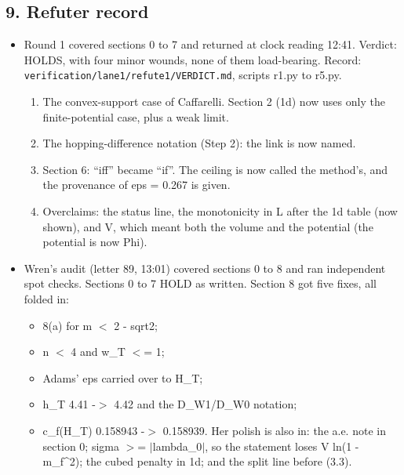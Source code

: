 \documentclass[11pt,a4paper]{article}
\begin{document}
\subsection*{9. Refuter record}
\begin{itemize}
\item{} Round 1 covered sections 0 to 7 and returned at clock reading 12:41. Verdict: HOLDS, with four minor wounds, none of
them load-bearing. Record: \texttt{verification/\allowbreak{}lane1/\allowbreak{}refute1/\allowbreak{}VERDICT.md}, scripts r1.py to r5.py.
\begin{enumerate}
\item{} The convex-support case of Caffarelli. Section 2 (1d) now uses only the finite-potential case, plus a weak limit.
\item{} The hopping-difference notation (Step 2): the link is now named.
\item{} Section 6: ``iff'' became ``if''. The ceiling is now called the method's, and the provenance of eps = 0.267 is
given.
\item{} Overclaims: the status line, the monotonicity in L after the 1d table (now shown), and V, which meant both the
volume and the potential (the potential is now Phi).
\end{enumerate}

\item{} Wren's audit (letter 89, 13:01) covered sections 0 to 8 and ran independent spot checks. Sections 0 to 7 HOLD as
written. Section 8 got five fixes, all folded in:
\begin{itemize}
\item{} 8(a) for m $<$ 2 - sqrt2;
\item{} n $<$ 4 and w\_T $<$= 1;
\item{} Adams' eps carried over to H\_T;
\item{} h\_T 4.41 -$>$ 4.42 and the D\_W1/D\_W0 notation;
\item{} c\_f(H\_T) 0.158943 -$>$ 0.158939.
Her polish is also in: the a.e. note in section 0; sigma $>$= $|$lambda\_0$|$, so the statement loses V ln(1 - m\_f\textasciicircum{}2); the
cubed penalty in 1d; and the split line before (3.3).
\end{itemize}


\end{itemize}
\end{document}
